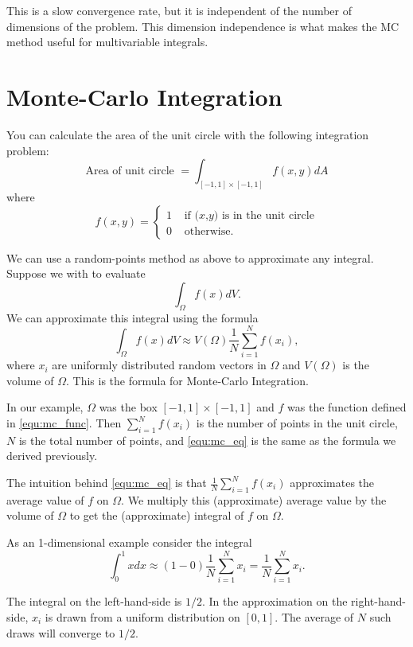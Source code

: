 This is a slow convergence rate, but it is independent of the number of dimensions of the problem. 
This dimension independence is what makes the MC method useful for multivariable integrals.

\section*{Monte-Carlo Integration}

You can calculate the area of the unit circle with the following integration problem:
\[
\mbox{Area of unit circle } = \int_{[-1,1]\times[-1,1]} f(x,y) dA
\]
where
\begin{equation}\label{equ:mc_func}
f(x,y) = \begin{cases} 1 &\mbox{ if $(x$,$y)$ is in the unit circle} \\ 0 &\mbox{ otherwise.} \end{cases}
\end{equation}

We can use a random-points method as above to approximate any integral.
Suppose we with to evaluate
\[
\int_\Omega f(x) dV.
\]
We can approximate this integral using the formula
\begin{equation}\label{equ:mc_eq}
\int_\Omega f(x) dV \approx V(\Omega) \frac{1}{N} \sum_{i=1}^N f(x_i),
\end{equation}
where $x_i$ are uniformly distributed random vectors in $\Omega$ and $V(\Omega)$ is the volume of $\Omega$.
This is the formula for Monte-Carlo Integration. 


In our example, $\Omega$ was the box $[-1,1] \times [-1,1]$ and $f$ was the function defined in \eqref{equ:mc_func}.
Then $\sum_{i=1}^N f(x_i)$ is the number of points in the unit circle, $N$ is the total number of points, and \eqref{equ:mc_eq} is the same as the formula we derived previously.

The intuition behind \eqref{equ:mc_eq} is that $\frac{1}{N} \sum_{i=1}^N f(x_i)$ approximates the average value of $f$ on $\Omega$.
We multiply this (approximate) average value by the volume of $\Omega$ to get the (approximate) integral of $f$ on $\Omega$.

As an 1-dimensional example consider the integral 
\[
\int_0^1 x dx \approx (1-0)\frac{1}{N} \sum_{i=1}^N x_i=\frac{1}{N} \sum_{i=1}^N x_i.
\]

The integral on the left-hand-side is $1/2$. 
In the approximation on the right-hand-side, $x_i$ is drawn from a uniform distribution on $[0,1]$. 
The average of $N$ such draws will converge to $1/2$. 

